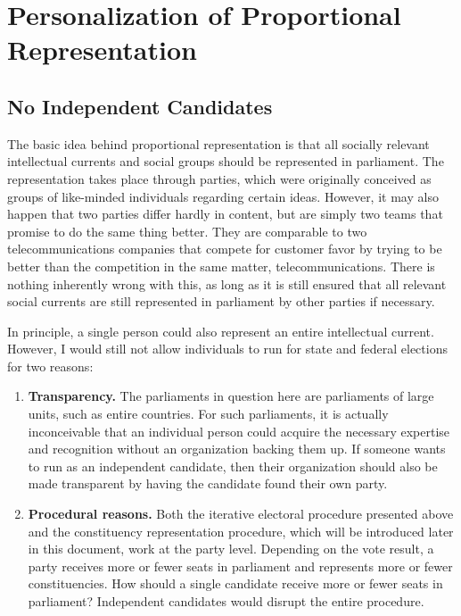 \section{Personalization of Proportional Representation}

\subsection{No Independent Candidates}

The basic idea behind proportional representation is that all socially
relevant intellectual currents and social groups should be represented in parliament. The
representation takes place through parties, which were originally conceived as groups of like-minded individuals
regarding certain ideas. However, it may also happen that two parties
differ hardly in content, but are simply two teams that promise to
do the same thing better. They are comparable to two telecommunications companies that
compete for customer favor by trying to be better than the competition in the same matter, telecommunications.
There is nothing inherently wrong with this, as long as it is still
ensured that all relevant social currents are still represented in parliament by other parties if necessary.

In principle, a single person could also represent an entire intellectual current.
However, I would still not allow individuals to run for state and
federal elections for two reasons:
\begin{enumerate}
  \item \textbf{Transparency.} The parliaments in question here are parliaments of large
    units, such as entire countries. For such parliaments, it is actually inconceivable
    that an individual person could acquire the necessary expertise and recognition without an organization
    backing them up. If someone wants to run as an independent candidate, then their
    organization should also be made transparent by having the candidate found their own party.

  \item \textbf{Procedural reasons.} Both the iterative electoral procedure presented above and
    the constituency representation procedure, which will be introduced later in this document,
    work at the party level. Depending on the vote result, a party receives more or fewer
    seats in parliament and represents more or fewer constituencies. How should a single candidate
    receive more or fewer seats in parliament? Independent candidates would disrupt the entire procedure.
\end{enumerate}

